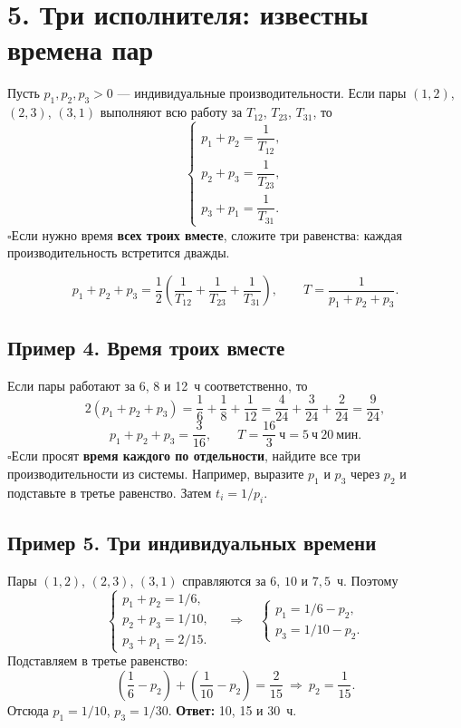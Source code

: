 \documentclass[a4paper,12pt]{article}
\newcommand{\checkitem}[1]{\noindent\(\square\)\enspace #1\par}
\newcommand{\keyterm}[1]{{\color{darkaccent}\textbf{#1}}}
\begin{document}
\clearpage
\section*{5. Три исполнителя: известны времена пар}
Пусть \(p_1,p_2,p_3>0\) --- индивидуальные производительности. Если пары \((1,2)\), \((2,3)\), \((3,1)\) выполняют всю работу за \(T_{12}\), \(T_{23}\), \(T_{31}\), то
\[
\begin{cases}
p_1+p_2=\dfrac1{T_{12}},\\[2mm]
p_2+p_3=\dfrac1{T_{23}},\\[2mm]
p_3+p_1=\dfrac1{T_{31}}.
\end{cases}
\]
\checkitem{Если нужно время \keyterm{всех троих вместе}, сложите три равенства: каждая производительность встретится дважды.}
\[
\boxed{p_1+p_2+p_3=\frac12\!\left(\frac1{T_{12}}+\frac1{T_{23}}+\frac1{T_{31}}\right),\qquad
T=\frac1{p_1+p_2+p_3}.}
\]
\subsection*{Пример 4. Время троих вместе}
Если пары работают за 6, 8 и 12~ч соответственно, то
\[
2(p_1+p_2+p_3)=\frac16+\frac18+\frac1{12}
=\frac4{24}+\frac3{24}+\frac2{24}=\frac9{24},
\]
\[
p_1+p_2+p_3=\frac3{16},\qquad T=\frac{16}{3}\ \text{ч}=5\ \text{ч}\ 20\ \text{мин}.
\]
\checkitem{Если просят \keyterm{время каждого по отдельности}, найдите все три производительности из системы. Например, выразите \(p_1\) и \(p_3\) через \(p_2\) и подставьте в третье равенство. Затем \(t_i=1/p_i\).}

\subsection*{Пример 5. Три индивидуальных времени}
Пары \((1,2)\), \((2,3)\), \((3,1)\) справляются за \(6\), \(10\) и \(7{,}5\)~ч. Поэтому
\[
\begin{cases}
p_1+p_2=1/6,\\
p_2+p_3=1/10,\\
p_3+p_1=2/15.
\end{cases}
\quad\Longrightarrow\quad
\begin{cases}
p_1=1/6-p_2,\\
p_3=1/10-p_2.
\end{cases}
\]
Подставляем в третье равенство:
\[
\left(\frac16-p_2\right)+\left(\frac1{10}-p_2\right)=\frac2{15}
\ \Longrightarrow\ p_2=\frac1{15}.
\]
Отсюда \(p_1=1/10\), \(p_3=1/30\). \keyterm{Ответ:} 10, 15 и 30~ч.
\end{document}
